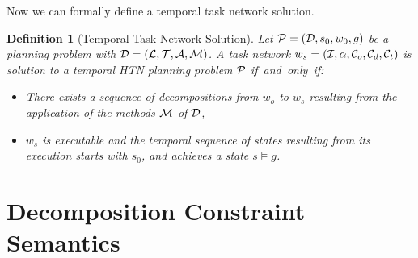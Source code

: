 \documentclass[letterpaper]{article} %
\newtheorem{definition}{Definition}
\begin{document}
Now we can formally define a temporal task network solution.

\begin{definition}[Temporal Task Network Solution]
  Let ${\cal{P}} = ({\cal{D}}, s_0, w_0, g)$ be a planning problem with $\cal{D} = ({\cal{L}}, {\cal{T}}, {\cal{A}}, {\cal{M}})$. A task network $w_s = ({\cal{I}}, \alpha, {\cal{C}}_o, {\cal{C}}_d, {\cal{C}}_t)$ is solution to a temporal HTN planning problem ${\cal{P}}$ \mbox{if and only if:}
  \begin{itemize}
    \item There exists a sequence of decompositions from $w_o$ to $w_s$ resulting from the application of the methods ${\cal{M}}$ of ${\cal{D}}$,
\item $w_s$ is executable and the temporal sequence of states resulting from its execution starts with $s_0$, and achieves a state $s \models g$.
\end{itemize}
\end{definition}

\section{Decomposition Constraint Semantics}
\label{Sec:Decomposition-Constraints-Semantics}
\end{document}
